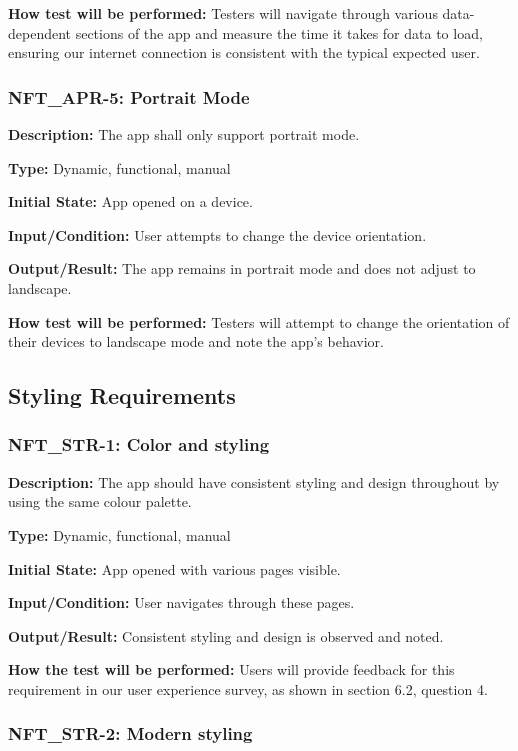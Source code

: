 \documentclass[12pt, titlepage]{article}
\begin{document}
\textbf{How test will be performed: }Testers will navigate through various data-dependent sections of the app and measure the time it takes for data to load, ensuring our internet connection is consistent with the typical expected user. 


\subsubsection*{\textbf{NFT\_APR-5: Portrait Mode}}


\textbf{Description:} The app shall only support portrait mode.

\textbf{Type: }Dynamic, functional, manual

\textbf{Initial State:} App opened on a device.

\textbf{Input/Condition:} User attempts to change the device orientation.

\textbf{Output/Result: }The app remains in portrait mode and does not adjust to landscape.

\textbf{How test will be performed:} Testers will attempt to change the orientation of their devices to landscape mode and note the app's behavior.
\newline
\subsection{Styling Requirements}


\subsubsection*{\textbf{NFT\_STR-1: Color and styling}}

\textbf{Description:} The app should have consistent styling and design throughout by using the same colour palette. 

\textbf{Type: }Dynamic, functional, manual

\textbf{Initial State:} App opened with various pages visible.

\textbf{Input/Condition:} User navigates through these pages. 

\textbf{Output/Result: }Consistent styling and design is observed and noted.

\textbf{How the test will be performed: }Users will provide feedback for this requirement in our user experience survey, as shown in section 6.2, question 4. 


\subsubsection*{\textbf{NFT\_STR-2: Modern styling}
}
\end{document}

